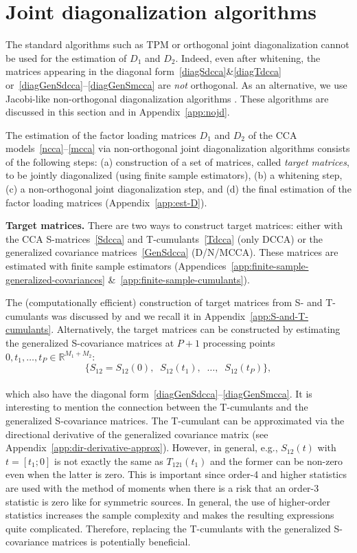 \documentclass{article}
\newcommand{\ppp}{\textbf}
\newcommand{\zero}{0}
\newcommand{\R}{\mathbb{R}}
\begin{document}
\section{Joint diagonalization algorithms}
\label{sec:jd}

The standard algorithms such as TPM or orthogonal joint diagonalization cannot be used for the estimation of $D_1$ and $D_2$. Indeed, even after whitening, the matrices appearing in the diagonal form~\eqref{diagSdcca}\&\eqref{diagTdcca} or~\eqref{diagGenSdcca}--\eqref{diagGenSmcca} are \emph{not} orthogonal. 
As an alternative, we use Jacobi-like non-orthogonal diagonalization algorithms \citep{FuGao2006,IfeEtAl2009,LucAlb2010}. These algorithms are discussed in this section and in Appendix~\ref{app:nojd}.

The estimation of the factor loading matrices $D_1$ and $D_2$ of the CCA models~\eqref{ncca}--\eqref{mcca} via non-orthogonal joint diagonalization algorithms consists of the following steps: (a) construction of a set of matrices, called \emph{target matrices}, to be jointly diagonalized (using finite sample estimators), (b) a whitening step, (c) a non-orthogonal joint diagonalization step, and (d) the final estimation of the factor loading matrices (Appendix~\ref{app:est-D}).
 

\ppp{Target matrices.}
There are two ways to construct target matrices: either with the CCA S-matrices~\eqref{Sdcca} and T-cumulants~\eqref{Tdcca} (only DCCA) or the generalized covariance matrices~\eqref{GenSdcca} (D/N/MCCA). These matrices are estimated with finite sample estimators (Appendices~\ref{app:finite-sample-generalized-covariances} \&~\ref{app:finite-sample-cumulants}).

The (computationally efficient) construction of target matrices from S- and T-cumulants was discussed by \citet{PodEtAl2015} and we recall it in Appendix~\ref{app:S-and-T-cumulants}.
Alternatively, the target matrices can be constructed by estimating the generalized S-covariance matrices
at $P+1$ processing points $\zero, t_1,\dots, t_P \in \R^{M_1+M_2}$:
\\[-1.0em]
\begin{equation}\label{jdmatricesGenS}
\{S_{12} = S_{12}(\zero), \;\; S_{12}(t_1), \;\; \dots, \;\; S_{12}(t_P)\},
\end{equation}
\\[-1.3em]
which also have the diagonal form~\eqref{diagGenSdcca}--\eqref{diagGenSmcca}. It is interesting to mention the connection between the T-cumulants and the generalized S-covariance matrices. The T-cumulant can be approximated via the directional derivative of the generalized covariance matrix (see Appendix~\ref{app:dir-derivative-approx}).
However, in general, e.g., $S_{12}(t)$ with $t=[t_1;\zero]$ is not exactly the same as $T_{121}(t_1)$ and the former can be non-zero even when the latter is zero. This is important since order-4 and higher statistics are used with the method of moments when there is a risk that an order-3 statistic is zero like for symmetric sources. 
In general, the use of higher-order statistics increases the sample complexity and makes the resulting expressions quite complicated.
Therefore, replacing the T-cumulants with the generalized S-covariance matrices is potentially beneficial.
\end{document}
